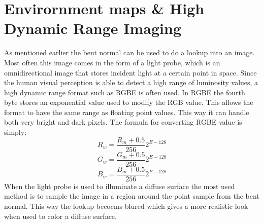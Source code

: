 \section{Envirornment maps \& High Dynamic Range Imaging}
As mentioned earlier the bent normal can be used to do a lookup into an image. Most often this image comes in the form of a light probe, which is an omnidirectional image that stores incident light at a certain point in space. Since the human visual perception is able to detect a high range of luminosity values, a high dynamic range format such as RGBE is often used. In RGBE the fourth byte stores an exponential value used to modify the RGB value. This allows the format to have the same range as floating point values. This way it can handle both very bright and dark pixels. The formula for converting RGBE value is simply:
\[
R_w = \frac{R_m + 0.5}{256} 2^{E-128} \]\[
G_w = \frac{G_m + 0.5}{256} 2^{E-128} \]\[
B_w = \frac{B_m + 0.5}{256} 2^{E-128} \]\[
\]
When the light probe is used to illuminate a diffuse surface the most used method is to sample the image in a region around the point sample from the bent normal. This way the lookup becoems blured which gives a more realistic look when used to color a diffuse surface\cite{Landis2002}.
